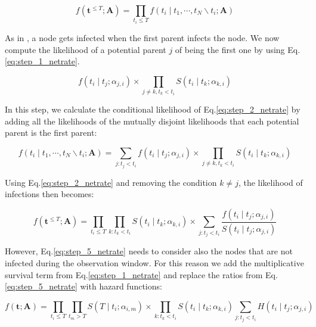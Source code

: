 \documentclass[11pt]{article}
\begin{document}
\begin{equation}\label{eq:step_2_netrate}
f(\textbf{t}^{\leq T};\textbf{A})=\prod_{t_{i}\leq T}f(t_{i}\mid t_{1},\cdots,t_{N}\backslash t_{i};\textbf{A})
\end{equation}

As in \cite{kempe2003maximizing}, a node gets infected when the first parent infects the node. We now compute the likelihood of a potential parent $j$ of being the first one by using Eq.\ref{eq:step_1_netrate}.

\begin{equation}\label{eq:step_3_netrate}
f(t_{i}\mid t_{j};\alpha_{j,i})\times \prod_{j\neq k,t_{k}< t_{i}}S(t_{i}\mid t_{k};\alpha _{k,i})
\end{equation}
 
In this step, we calculate the conditional likelihood of Eq.\ref{eq:step_2_netrate} by adding all the likelihoods of the mutually disjoint likelihoods that each potential parent is the first parent:

\begin{equation}\label{eq:step_4_netrate}
f(t_{i}\mid t_{1},\cdots,t_{N}\backslash t_{i};\textbf{A})=\sum_{j:t_{j}<t_{i}}f(t_{i}\mid t_{j};\alpha _{j,i})\times \prod _{j\neq k,t_{k}<t_{i}}S(t_{i}\mid t_{k};\alpha _{k,i})
\end{equation}

Using Eq.\ref{eq:step_2_netrate} and removing the condition $k\neq j$, the likelihood of infections then becomes:

\begin{equation}\label{eq:step_5_netrate}
f(\textbf{t}^{\leq T};\textbf{A})=\prod_{t_{i}\leq T}\prod_{k:t_{k}<t_{i}}S(t_{i}\mid t_{k};\alpha _{k,i})\times \sum_{j:t_{j}<t_{i}}\frac{f(t_{i}\mid t_{j};\alpha_{j,i})}{S(t_{i}\mid t_{j};\alpha _{j,i})}
\end{equation}

However, Eq.\ref{eq:step_5_netrate} needs to consider also the nodes that are not infected during the observation window. For this reason we add the multiplicative survival term from Eq.\ref{eq:step_1_netrate} and replace the ratios from Eq.\ref{eq:step_5_netrate} with hazard functions:

\begin{equation}\label{eq:step_6_netrate}
f(\textbf{t};\textbf{A})=\prod_{t_{i}\leq T}\prod_{t_{m}>T}S(T\mid t_{i};\alpha_{i,m})\times \prod_{k:t_{k}<t_{i}}S(t_{i}\mid t_{k};\alpha _{k,i})\sum_{j:t_{j}<t_{i}}H(t_{i}\mid t_{j};\alpha _{j,i})
\end{equation}
\end{document}

